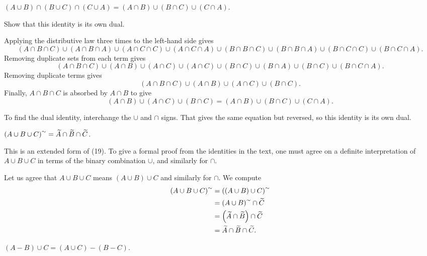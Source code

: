\documentclass{report}
\begin{document}
\begin{exercise}
$(A\cup B)\cap(B\cup C)\cap(C\cup A) = (A\cap B)\cup(B\cap C)\cup(C\cap A)$.

Show that this identity is its own dual.
\end{exercise}

\begin{solution}
Applying the distributive law three times to the left-hand side gives
\[
    (A\cap B\cap C)\cup(A\cap B\cap A)\cup(A\cap C\cap C)\cup(A\cap C\cap A)
    \cup(B\cap B\cap C)\cup(B\cap B\cap A)\cup(B\cap C\cap C)\cup(B\cap C\cap A).
\]
Removing duplicate sets from each term gives
\[
    (A\cap B\cap C)\cup(A\cap B)\cup(A\cap C)\cup(A\cap C)\cup(B\cap C)\cup(B\cap A)
    \cup(B\cap C)\cup(B\cap C\cap A).
\]
Removing duplicate terms gives
\[(A\cap B\cap C)\cup(A\cap B)\cup(A\cap C)\cup(B\cap C).\]
Finally, $A\cap B\cap C$ is absorbed by $A\cap B$ to give
\[(A\cap B)\cup(A\cap C)\cup(B\cap C) = (A\cap B)\cup(B\cap C)\cup(C\cap A).\]

To find the dual identity, interchange the $\cup$ and $\cap$ signs. That gives
the same equation but reversed, so this identity is its own dual.
\end{solution}

\begin{exercise}
$\left(A\cup B\cup C\right)^{\sim}= \widetilde{A}\cap \widetilde{B}\cap \widetilde{C}$.

This is an extended form of (19). To give a formal proof from the identities in the text,
one must agree on a definite interpretation of $A\cup B\cup C$ in terms of the binary
combination $\cup$, and similarly for $\cap$.
\end{exercise}

\begin{solution} 
Let us agree that $A\cup B\cup C$ means $(A\cup B)\cup C$ and similarly for $\cap$.
We compute
\[
\begin{aligned}
    \left(A\cup B\cup C\right)^{\sim} &= \left((A\cup B)\cup C\right)^{\sim} \\
    &= \left(A\cup B\right)^{\sim} \cap \widetilde{C} \\
    &= \left(\widetilde{A}\cap \widetilde{B}\right) \cap \widetilde{C} \\
    &= \widetilde{A}\cap \widetilde{B} \cap \widetilde{C}.
\end{aligned}
\]
\end{solution}

\begin{exercise} \label{ex:test}
$(A - B)\cup C = (A\cup C) - (B-C)$.
\end{exercise}
\end{document}
